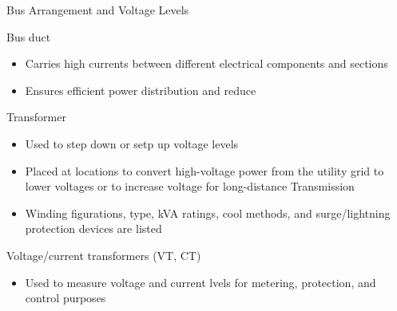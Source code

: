 Bus Arrangement and Voltage Levels
\begin{define}
    Bus duct  
    \begin{itemize}
        \item Carries high currents between different electrical components and sections
        \item Ensures efficient power distribution and reduce
    \end{itemize}
    Transformer 
    \begin{itemize}
        \item Used to step down or setp up voltage levels
        \item Placed at locations to convert high-voltage power from the utility grid to lower voltages or to increase voltage for long-distance Transmission
        \item Winding figurations, type, kVA ratings, cool methods, and surge/lightning protection devices are listed
    \end{itemize}
    Voltage/current transformers (VT, CT)
    \begin{itemize}
        \item Used to measure voltage and current lvels for metering, protection, and control purposes
    \end{itemize}
\end{define}